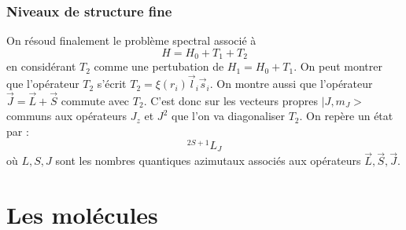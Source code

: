 \documentclass[12pt]{book}
\begin{document}
\subsubsection{Niveaux de structure fine}
On r\'esoud finalement le probl\`eme spectral associ\'e \`a
\begin{equation}
H=H_0+T_1+T_2
\end{equation}
en consid\'erant $T_2$ comme une pertubation de $H_1=H_0+T_1$.
On peut montrer \cite{ph:atomi:Cagnac71} que l'op\'erateur $T_2$ s'\'ecrit
$T_2=\xi(r_i)\vec l_i\vec s_i$.
On montre aussi que l'op\'erateur $\vec J=\vec L+\vec S$ commute avec
$T_2$. C'est donc sur les vecteurs propres $|J,m_J>$
communs aux op\'erateurs $J_z$ et $J^2$ que l'on va diagonaliser
$T_2$. On rep\`ere un \'etat par : 
\begin{equation}
^{2S+1}L_{J}
\end{equation}
o\`u $L,S,J$ sont les nombres quantiques azimutaux associ\'es aux
op\'erateurs  $\vec L,\vec S,\vec J$.

\section{Les mol\'ecules}\label{secmolecmq}
\end{document}
